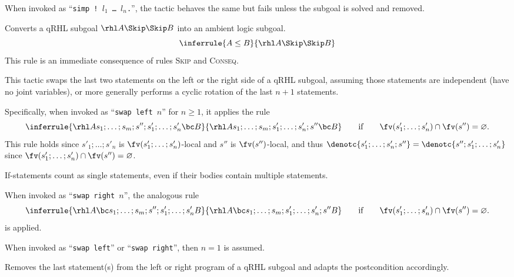 \documentclass{article}
\renewcommand\rulerefx[1]{\hbox{\textsc{#1}}}
\begin{document}
When invoked as ``\texttt{simp ! $l_1$
  \dots{} $l_n$.}'',
the tactic behaves the same but fails unless the subgoal is solved and
removed.



Converts a qRHL subgoal $\rhl A\Skip\Skip B$
into an ambient logic subgoal.
\[
\inferrule{
  A \leq B
}{
  \rhl A \Skip \Skip B
}
\]
This rule is an immediate consequence of rules \rulerefx{Skip} and \rulerefx{Conseq}.


This tactic swaps the last two statements on the left or the right side of a qRHL subgoal,
assuming those statements are independent (have no joint variables),
or more generally performs a cyclic rotation of the last $n+1$ statements.

Specifically, when invoked as ``\texttt{swap left $n$}'' for $n\geq1$, it applies the rule
\[
  \inferrule
  {\rhl A{s_1;\dots;s_{m};s'';s'_{1};\dots;s'_{n}}{\bc}{B}}
  {\rhl A{s_1;\dots;s_{m};s'_{1};\dots;s'_{n};s''}{\bc}{B}}
  \qquad
  \text{if}
  \qquad
  \fv(s'_{1};\dots;s'_{n})\cap \fv(s'')=\varnothing.
\]
This rule holds since $s'_{1};\dots;s'_{n}$
is $\fv(s'_{1};\dots;s'_{n})$-local
and $s''$
is $\fv(s'')$-local,
and thus $\denotc{s'_{1};\dots;s'_{n};s''}=\denotc{s'';s'_{1};\dots;s'_{n}}$
since $\fv(s'_{1};\dots;s'_{n})\cap \fv(s'')=\varnothing$.

If-statements count as single statements, even if their bodies contain
multiple statements.

When invoked as ``\texttt{swap right $n$}'', the analogous rule 
\[
  \inferrule
  {\rhl A{\bc}{s_1;\dots;s_{m};s'';s'_{1};\dots;s'_{n}}{B}}
  {\rhl A{\bc}{s_1;\dots;s_{m};s'_{1};\dots;s'_{n};s''}{B}}
  \qquad
  \text{if}
  \qquad
  \fv(s'_{1};\dots;s'_{n})\cap \fv(s'')=\varnothing.
\]
is applied.

When invoked as ``\texttt{swap left}'' or ``\texttt{swap right}'', then $n=1$ is assumed.


Removes the last statement(s) from the left or right program of a qRHL
subgoal and adapts the postcondition accordingly.

\newcommand\WP{\operatorname{wp}}%
\end{document}
